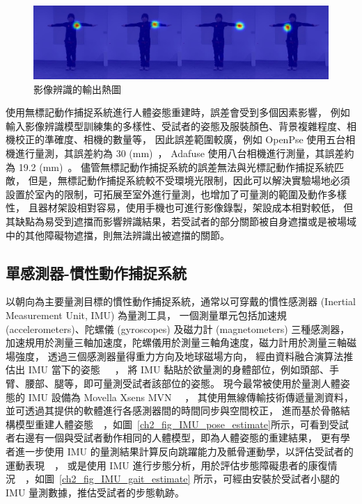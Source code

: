 \begin{figure}[!ht]
    \centering
    \includegraphics[width=\linewidth]{figure/ch2_fig_heatmap.jpg}
     \caption[影像辨識的輸出熱圖]{影像辨識的輸出熱圖}
     \label{ch2_fig_heatmap}
\end{figure}

使用無標記動作捕捉系統進行人體姿態重建時，誤差會受到多個因素影響，
例如輸入影像辨識模型訓練集的多樣性、受試者的姿態及服裝顏色、背景複雜程度、相機校正的準確度、相機的數量等，
因此誤差範圍較廣，例如 OpenPse 使用五台相機進行量測，其誤差約為 30 (mm)~\cite{nakano2020evaluation}，
Adafuse 使用八台相機進行測量，其誤差約為 19.2 (mm)~\cite{zhang2020adafuse}。
儘管無標記動作捕捉系統的誤差無法與光標記動作捕捉系統匹敵，
但是，無標記動作捕捉系統較不受環境光限制，因此可以解決實驗場地必須設置於室內的限制，可拓展至室外進行量測，也增加了可量測的範圍及動作多樣性，
且器材架設相對容易，使用手機也可進行影像錄製，架設成本相對較低，
但其缺點為易受到遮擋而影響辨識結果，若受試者的部分關節被自身遮擋或是被場域中的其他障礙物遮擋，則無法辨識出被遮擋的關節。

\subsection{單感測器-慣性動作捕捉系統}
以朝向為主要量測目標的慣性動作捕捉系統，通常以可穿戴的慣性感測器 (Inertial Measurement Unit, IMU) 為量測工具，
一個測量單元包括加速規 (accelerometers)、陀螺儀 (gyroscopes) 及磁力計 (magnetometers) 三種感測器，
加速規用於測量三軸加速度，陀螺儀用於測量三軸角速度，磁力計用於測量三軸磁場強度，
透過三個感測器量得重力方向及地球磁場方向，
經由資料融合演算法推估出 IMU 當下的姿態~\cite{young2009comparison}~\cite{madgwick2011estimation}~\cite{nazarahari202140}，
將 IMU 黏貼於欲量測的身體部位，例如頭部、手臂、腰部、腿等，即可量測受試者該部位的姿態。
現今最常被使用於量測人體姿態的 IMU 設備為 Movella Xsens MVN ~\cite{roetenberg2009xsens}~\cite{paulich2018xsens}，
其使用無線傳輸技術傳遞量測資料，並可透過其提供的軟體進行各感測器間的時間同步與空間校正，
進而基於骨骼結構模型重建人體姿態~\cite{mcgrath2020body}~\cite{DIP:SIGGRAPHAsia:2018}，如圖~\ref{ch2_fig_IMU_pose_estimate}所示，可看到受試者右邊有一個與受試者動作相同的人體模型，即為人體姿態的重建結果，
更有學者進一步使用 IMU 的量測結果計算反向跳躍能力及骶骨運動學，以評估受試者的運動表現~\cite{mcginnis2016quantifying}~\cite{miranda2022accuracy}，
或是使用 IMU 進行步態分析，用於評估步態障礙患者的康復情況~\cite{wang2020imu}~\cite{uchitomi2022three}，如圖~\ref{ch2_fig_IMU_gait_estimate} 所示，可經由安裝於受試者小腿的 IMU 量測數據，推估受試者的步態軌跡。

